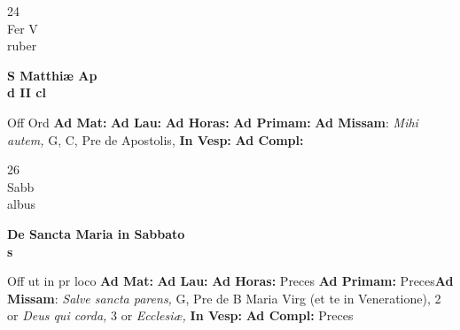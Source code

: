 \documentclass[10pt, openany]{book}
\begin{document}
    \begin{center}
        \begin{minipage}{3.5in}
            \vspace{2em}
            \begin{minipage}{0.5in}
                {\Huge 24} \\
                {\normalsize Fer V} \\
                {\normalsize ruber}
            \end{minipage}
            \begin{minipage}{3.0in}
                \textbf{ \large S Matthiæ Ap \\
                \textnormal{\normalsize d II cl}} \\ 
            \end{minipage}
            \begin{justify}Off Ord
                \textbf{Ad Mat: }
                \textbf{Ad Lau: }
                \textbf{Ad Horas: }
                \textbf{Ad Primam: }\textbf{Ad Missam}: \textit{Mihi autem,} G, C, Pre de Apostolis,  
                \textbf{In Vesp: }
                \textbf{Ad Compl: }
            \end{justify}
        \end{minipage}
    \end{center}

    \begin{center}
        \begin{minipage}{3.5in}
            \vspace{2em}
            \begin{minipage}{0.5in}
                {\Huge 26} \\
                {\normalsize Sabb} \\
                {\normalsize albus}
            \end{minipage}
            \begin{minipage}{3.0in}
                \textbf{ \large De Sancta Maria in Sabbato \\
                \textnormal{\normalsize s}} \\ 
            \end{minipage}
            \begin{justify}Off ut in pr loco
                \textbf{Ad Mat: }
                \textbf{Ad Lau: }
                \textbf{Ad Horas: }Preces
                \textbf{Ad Primam: }Preces\textbf{Ad Missam}: \textit{Salve sancta parens,} G, Pre de B Maria Virg (et te in Veneratione), 2 or \textit{Deus qui corda,} 3 or \textit{Ecclesiæ,}  
                \textbf{In Vesp: }
                \textbf{Ad Compl: }Preces
            \end{justify}
        \end{minipage}
    \end{center}
\end{document}
